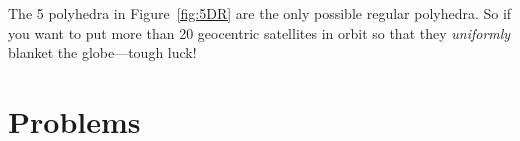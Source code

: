 The 5 polyhedra in Figure~\ref{fig:5DR} are the only possible regular
polyhedra.  So if you want to put more than 20 geocentric satellites
in orbit so that they \emph{uniformly} blanket the globe---tough luck!

\section{Problems}

\begin{problems}

\examproblems
{}

\classproblems
{}

\homeworkproblems
{}

\end{problems}


\endinput
